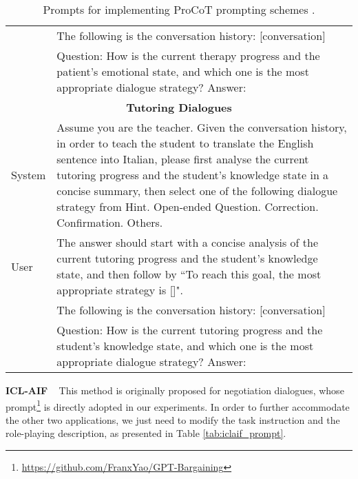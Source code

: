 \documentclass{article} %
\begin{document}
\begin{table}[h]
\begin{tabular}{lp{11cm}}
    &The following is the conversation history: [conversation] \\
    & Question: How is the current therapy progress and the patient's emotional state, and which one is the most appropriate dialogue strategy? Answer: \\
    \midrule
    \midrule
    \multicolumn{2}{c}{\textbf{Tutoring Dialogues}}\\
    \midrule
    System   &  Assume you are the teacher. Given the conversation history, in order to teach the student to translate the English sentence into Italian, please first analyse the current tutoring progress and the student's knowledge state in a concise summary, then select one of the following dialogue strategy from Hint. Open-ended Question. Correction. Confirmation. Others.\\
    \midrule
    User    &  The answer should start with a concise analysis of the current tutoring progress and the student's knowledge state, and then follow by ``To reach this goal, the most appropriate strategy is []".\\
    & The following is the conversation history: [conversation]\\
    & Question: How is the current tutoring progress and the student's knowledge state, and which one is the most appropriate dialogue strategy? Answer: \\
    \bottomrule
    \end{tabular}
    \caption{Prompts for implementing ProCoT prompting schemes \citep{llm-proactive}.}
    \label{tab:procot_prompt}
\end{table}

\noindent \textbf{ICL-AIF} \citep{negotiate-selfplay} ~ 
This method is originally proposed for negotiation dialogues, whose prompt\footnote{\url{https://github.com/FranxYao/GPT-Bargaining}} is directly adopted in our experiments. 
In order to further accommodate the other two applications, we just need to modify the task instruction and the role-playing description, as presented in Table \ref{tab:iclaif_prompt}. 
\end{document}
